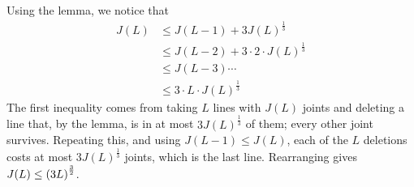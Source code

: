 Using the lemma, we notice that
\begin{align*}
    J(L)
    &\leq J(L - 1) + 3J(L)^{\frac{1}{3}} \\
    &\leq J(L - 2) + 3 \cdot 2 \cdot J(L)^{\frac{1}{3}} \\
    &\leq J(L - 3) \cdots \\
    &\leq 3 \cdot L \cdot J(L)^{\frac{1}{3}}
\end{align*}
The first inequality comes from taking $L$ lines with $J(L)$ joints and deleting a line that, by the lemma, is in at most $3J(L)^{\frac{1}{3}}$ of them; every other joint survives. Repeating this, and using $J(L - 1) \leq J(L)$, each of the $L$ deletions costs at most $3J(L)^{\frac{1}{3}}$ joints, which is the last line. Rearranging gives $J(L) \leq \left( 3L \right)^{\frac{3}{2}}$.
